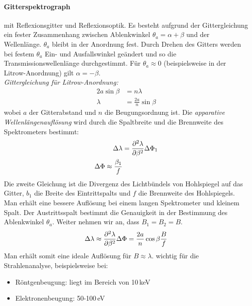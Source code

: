 \paragraph{Gitterspektrograph} mit Reflexionsgitter und Reflexionsoptik. Es besteht aufgrund der Gittergleichung ein fester Zusammenhang zwischen Ablenkwinkel $\theta_a=\alpha+\beta$ und der Wellenlänge.
$\theta_a$ bleibt in der Anordnung fest. Durch Drehen des Gitters werden bei festem $\theta_a$ Ein- und Ausfallswinkel geändert und so die Transmissionswellenlänge durchgestimmt.
Für $\theta_a\approx 0$ (beispielsweise in der Litrow-Anordnung) gilt $\alpha=-\beta$.\\
\emph{Gittergleichung für Litrow-Anordnung:}
\begin{align*}
	2a\sin\beta&=n\lambda\\
	\lambda&= \frac{2a}{n}\sin\beta
\end{align*}
wobei $a$ der Gitterabstand und $n$ die Beugungsordnung ist. Die \emph{apparative Wellenlängenauflösung} wird durch die Spaltbreite und die Brennweite des Spektrometers bestimmt:
\begin{align*}
	\Delta\lambda&=\diff[\lambda]{\beta}\Delta\Phi_1\\
	\Delta\Phi\approx \frac{\beta_1}{f}
\end{align*}
Die zweite Gleichung ist die Divergenz des Lichtbündels von Hohlspiegel auf das Gitter, $b_1$ die Breite des Eintrittspalts und $f$ die Brennweite des Hohlspiegels. Man erhält eine bessere Auflösung bei einem langen Spektrometer und kleinem Spalt. Der Austrittsspalt bestimmt die Genauigkeit in der Bestimmung des Ablenkwinkel $\theta_a$. Weiter nehmen wir an, dass $B_1=B_2=B$.
\begin{align*}
	\Delta\lambda\approx\diff[\lambda]{\beta}\Delta\Phi=\frac{2a}{n}\cos\beta \frac{B}{f}
\end{align*}
Man erhält somit eine ideale Auflösung für $B\approx\lambda$.
wichtig für die Strahlenanalyse, beispielsweise bei:
\begin{itemize}
	\item Röntgenbeugung: liegt im Bereich von 10\,keV
	\item Elektronenbeugung: 50-100\,eV
\end{itemize}


